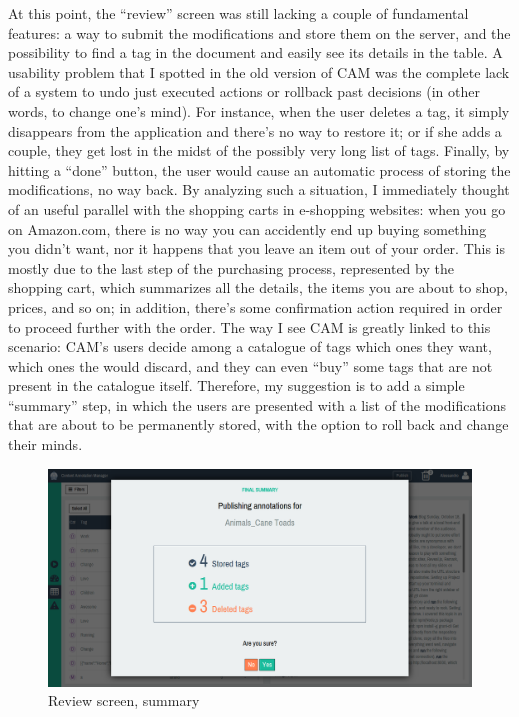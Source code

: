 \documentclass[12pt,oneside,svgnames]{memoir}
\begin{document}
At this point, the ``review'' screen was still lacking a couple of
fundamental features: a way to submit the modifications and store them
on the server, and the possibility to find a tag in the document and
easily see its details in the table. A usability problem that I spotted
in the old version of CAM was the complete lack of a system to undo just
executed actions or rollback past decisions (in other words, to change
one's mind). For instance, when the user deletes a tag, it simply
disappears from the application and there's no way to restore it; or if
she adds a couple, they get lost in the midst of the possibly very long
list of tags. Finally, by hitting a ``done'' button, the user would
cause an automatic process of storing the modifications, no way back. By
analyzing such a situation, I immediately thought of an useful parallel
with the shopping carts in e-shopping websites: when you go on
Amazon.com, there is no way you can accidently end up buying something
you didn't want, nor it happens that you leave an item out of your
order. This is mostly due to the last step of the purchasing process,
represented by the shopping cart, which summarizes all the details, the
items you are about to shop, prices, and so on; in addition, there's
some confirmation action required in order to proceed further with the
order. The way I see CAM is greatly linked to this scenario: CAM's users
decide among a catalogue of tags which ones they want, which ones the
would discard, and they can even ``buy'' some tags that are not present
in the catalogue itself. Therefore, my suggestion is to add a simple
``summary'' step, in which the users are presented with a list of the
modifications that are about to be permanently stored, with the option
to roll back and change their minds.

\begin{figure}[htbp]
\centering
\includegraphics{./src/img/review-summary.png}
\caption{Review screen, summary}
\end{figure}
\end{document}
